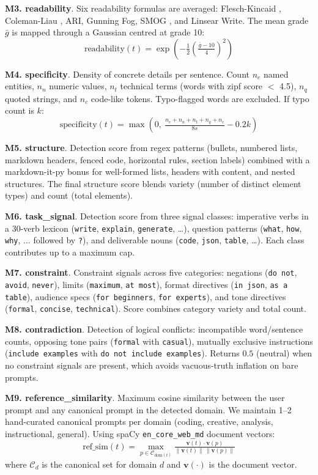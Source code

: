 \documentclass[conference]{IEEEtran}
\begin{document}
\textbf{M3. readability}. Six readability formulas are averaged: Flesch-Kincaid \cite{flesch}, Coleman-Liau \cite{coleman}, ARI, Gunning Fog, SMOG \cite{smog}, and Linsear Write. The mean grade $\bar{g}$ is mapped through a Gaussian centred at grade 10:
\[ \mathrm{readability}(t) = \exp\!\left(-\tfrac{1}{2}\left(\tfrac{\bar{g} - 10}{4}\right)^2\right) \]

\textbf{M4. specificity}. Density of concrete details per sentence. Count $n_e$ named entities, $n_n$ numeric values, $n_t$ technical terms (words with zipf score $<$ 4.5), $n_q$ quoted strings, and $n_c$ code-like tokens. Typo-flagged words are excluded. If typo count is $k$:
\[ \mathrm{specificity}(t) = \max\!\left(0,\ \tfrac{n_e + n_n + n_t + n_q + n_c}{8 s} - 0.2 k\right) \]

\textbf{M5. structure}. Detection score from regex patterns (bullets, numbered lists, markdown headers, fenced code, horizontal rules, section labels) combined with a markdown-it-py bonus for well-formed lists, headers with content, and nested structures. The final structure score blends variety (number of distinct element types) and count (total elements).

\textbf{M6. task\_signal}. Detection score from three signal classes: imperative verbs in a 30-verb lexicon (\texttt{write}, \texttt{explain}, \texttt{generate}, \ldots), question patterns (\texttt{what}, \texttt{how}, \texttt{why}, $\ldots$ followed by \texttt{?}), and deliverable nouns (\texttt{code}, \texttt{json}, \texttt{table}, \ldots). Each class contributes up to a maximum cap.

\textbf{M7. constraint}. Constraint signals across five categories: negations (\texttt{do not}, \texttt{avoid}, \texttt{never}), limits (\texttt{maximum}, \texttt{at most}), format directives (\texttt{in json}, \texttt{as a table}), audience specs (\texttt{for beginners}, \texttt{for experts}), and tone directives (\texttt{formal}, \texttt{concise}, \texttt{technical}). Score combines category variety and total count.

\textbf{M8. contradiction}. Detection of logical conflicts: incompatible word/sentence counts, opposing tone pairs (\texttt{formal} with \texttt{casual}), mutually exclusive instructions (\texttt{include examples} with \texttt{do not include examples}). Returns $0.5$ (neutral) when no constraint signals are present, which avoids vacuous-truth inflation on bare prompts.

\textbf{M9. reference\_similarity}. Maximum cosine similarity between the user prompt and any canonical prompt in the detected domain. We maintain 1--2 hand-curated canonical prompts per domain (coding, creative, analysis, instructional, general). Using spaCy \texttt{en\_core\_web\_md} document vectors:
\[ \mathrm{ref\_sim}(t) = \max_{p \in \mathcal{C}_{\text{dom}(t)}} \tfrac{\mathbf{v}(t) \cdot \mathbf{v}(p)}{\|\mathbf{v}(t)\| \, \|\mathbf{v}(p)\|} \]
where $\mathcal{C}_d$ is the canonical set for domain $d$ and $\mathbf{v}(\cdot)$ is the document vector.
\end{document}
